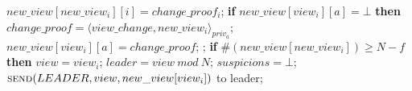 \begin{algorithm}
\begin{algorithmic}[1]
		\State
		\State\hspace{\algorithmicindent} $new\_view[new\_view_i][i] = change\_proof_i$;
		\State\hspace{\algorithmicindent} \textbf{if} $new\_view[view_i][a] = \bot$ \textbf{then}				\State\hspace{\algorithmicindent}\hspace{\algorithmicindent} $change\_proof = \langle view\_change, new\_view_i \rangle_{priv_a}$;
		\State\hspace{\algorithmicindent}\hspace{\algorithmicindent} $new\_view[view_i][a] = change\_proof$;
		\State\hspace{\algorithmicindent}\hspace{\algorithmicindent}  ;
		\State
		\State\hspace{\algorithmicindent} \textbf{if} $\#(new\_view[new\_view_i]) \geq N-f$ \textbf{then}
		\State\hspace{\algorithmicindent}\hspace{\algorithmicindent} $view = view_i$;
		\State\hspace{\algorithmicindent}\hspace{\algorithmicindent} $leader = view\ mod\ N$;
		\State\hspace{\algorithmicindent}\hspace{\algorithmicindent} $suspicions = \bot$;
		\State\hspace{\algorithmicindent}\hspace{\algorithmicindent} $\Call{send}{LEADER, view, new\_view[view_i]}$ to leader;
	\end{algorithmic}
\end{algorithm}

